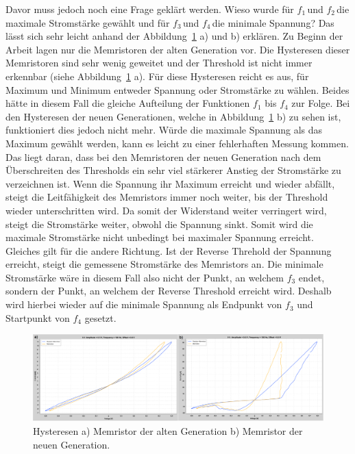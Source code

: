 Davor muss jedoch noch eine Frage geklärt werden. Wieso wurde für \glqq $f_1$\grqq\,und \glqq $f_2$\grqq\,die maximale Stromstärke gewählt und für \glqq $f_3$\grqq\,und \glqq $f_4$\grqq\,die minimale Spannung? Das lässt sich sehr leicht anhand der Abbildung~\ref{fig:Hysteresen_Vergleich} a) und b) erklären. Zu Beginn der Arbeit lagen nur die Memristoren der alten Generation vor. Die Hysteresen dieser Memristoren sind sehr wenig geweitet und der Threshold ist nicht immer erkennbar (siehe Abbildung~\ref{fig:Hysteresen_Vergleich} a). Für diese Hysteresen reicht es aus, für Maximum und Minimum entweder Spannung oder Stromstärke zu wählen. Beides hätte in diesem Fall die gleiche Aufteilung der Funktionen $f_1$ bis $f_4$ zur Folge. Bei den Hysteresen der neuen Generationen, welche in Abbildung~\ref{fig:Hysteresen_Vergleich} b) zu sehen ist, funktioniert dies jedoch nicht mehr. Würde die maximale Spannung als das Maximum gewählt werden, kann es leicht zu einer fehlerhaften Messung kommen. Das liegt daran, dass bei den Memristoren der neuen Generation nach dem Überschreiten des Thresholds ein sehr viel stärkerer Anstieg der Stromstärke zu verzeichnen ist. Wenn die Spannung ihr Maximum erreicht und wieder abfällt, steigt die Leitfähigkeit des Memristors immer noch weiter, bis der Threshold wieder unterschritten wird. Da somit der Widerstand weiter verringert wird, steigt die Stromstärke weiter, obwohl die Spannung sinkt. Somit wird die maximale Stromstärke nicht unbedingt bei maximaler Spannung erreicht. Gleiches gilt für die andere Richtung. Ist der Reverse Threhold der Spannung erreicht, steigt die gemessene Stromstärke des Memristors an. Die minimale Stromstärke wäre in diesem Fall also nicht der Punkt, an welchem $f_3$ endet, sondern der Punkt, an welchem der Reverse Threshold erreicht wird. Deshalb wird hierbei wieder auf die minimale Spannung als Endpunkt von $f_3$ und Startpunkt von $f_4$ gesetzt.

\begin{figure}
  \centering
    \includegraphics[width=\textwidth]{images/Hysteresen_Vergleich_2.png}
  \caption{Hysteresen a) Memristor der alten Generation b) Memristor der neuen Generation.}
  \label{fig:Hysteresen_Vergleich}
\end{figure}

